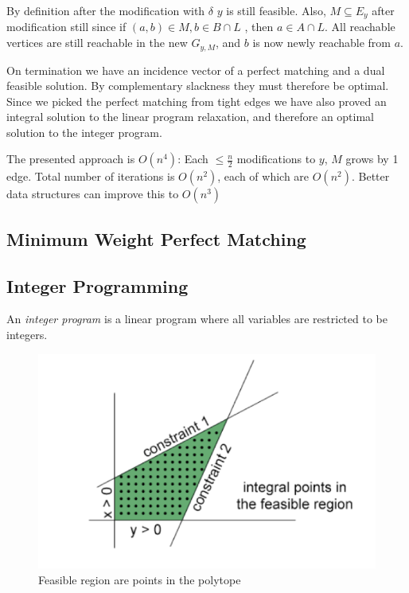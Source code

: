\documentclass[../notes.tex]{subfiles}
\begin{document}
By definition after the modification with $ \delta $ $ y $ is still feasible. Also, $ M \subseteq E_y $ after modification still since if $ (a,b) \in M, b \in B \cap L   $ , then $ a \in A \cap L $.
All reachable vertices are still reachable in the new $ G_{y, M}$, and $ b $ is now newly reachable from $ a $.

On termination we have an incidence vector of a perfect matching and a dual feasible solution. By complementary slackness they must therefore be optimal.
Since we picked the perfect matching from tight edges we have also proved an integral solution to the linear program relaxation, and therefore an optimal solution to the integer program.


The presented approach is $ O(n^4) $: Each $ \le \frac{n}{2} $ modifications to $ y $, $ M  $ grows by 1 edge. Total number of iterations is $ O(n^2) $, each of which are $ O(n^2) $. Better data structures can improve this to $ O(n^3) $
















\subsection{Minimum Weight Perfect Matching}

\subsection{Integer Programming}

\begin{definition}
    An \textit{integer program} is a linear program where all variables are restricted to be integers.

    \begin{figure}[H]
        \centering
        \includegraphics[width=0.8\linewidth]{img/image_2023-03-31-12-33-41.png}
        \caption{Feasible region are points in the polytope}
    \end{figure}

\end{definition}
\end{document}
